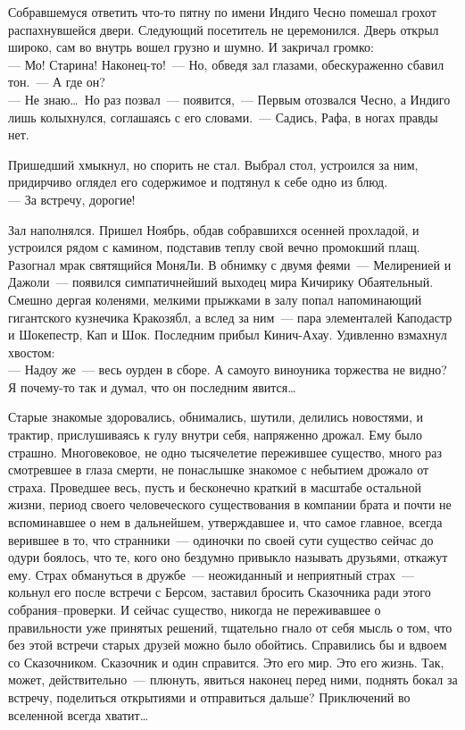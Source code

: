 Собравшемуся ответить что-то пятну по имени Индиго Чесно помешал грохот 
распахнувшейся двери. Следующий посетитель не церемонился. Дверь открыл широко, 
сам во внутрь вошел грузно и шумно. И закричал громко:\\
--- Мо! Старина! Наконец-то!~--- Но, обведя зал глазами, обескураженно сбавил 
тон.~--- А где он?\\
--- Не знаю\ldots\ Но раз позвал~--- появится,~--- Первым отозвался Чесно, а 
Индиго лишь колыхнулся, соглашаясь с его словами.~--- Садись, Рафа, в ногах правды нет.

Пришедший хмыкнул, но спорить не стал. Выбрал стол, устроился за ним, 
придирчиво оглядел его содержимое и подтянул к себе одно из блюд.\\
--- За встречу, дорогие!


Зал наполнялся. Пришел Ноябрь, обдав собравшихся осенней прохладой, и устроился 
рядом с камином, подставив теплу свой вечно промокший плащ. Разогнал мрак 
святящийся МоняЛи. В обнимку с двумя феями~--- Мелиренией и Дажоли~--- появился 
симпатичнейший выходец мира Кичирику Обаятельный. Смешно дергая коленями, 
мелкими прыжками в залу попал напоминающий гигантского кузнечика Кракозябл, а 
вслед за ним~--- пара элементалей Каподастр и Шокепестр, Кап и Шок. Последним 
прибыл Кинич-Ахау. Удивленно взмахнул хвостом:\\
--- Надоу же~--- весь оурден в сборе. А самоуго виноуника торжества не видно? Я 
почему-то так и думал, что он последним явится\ldots


Старые знакомые здоровались, обнимались, шутили, делились новостями, и трактир, 
прислушиваясь к гулу внутри себя, напряженно дрожал. Ему было страшно. 
Многовековое, не одно тысячелетие пережившее существо, много раз смотревшее в 
глаза смерти, не понаслышке знакомое с небытием дрожало от страха. Проведшее 
весь, пусть и бесконечно краткий в масштабе остальной жизни, период своего 
человеческого существования в компании брата и почти не вспоминавшее о нем в 
дальнейшем, утверждавшее и, что самое главное, всегда верившее в то, что 
странники~--- одиночки по своей сути существо сейчас до одури боялось, что те, 
кого оно бездумно привыкло называть друзьями, откажут ему. Страх обмануться в 
дружбе~--- неожиданный и неприятный страх~--- кольнул его после встречи с 
Берсом, заставил бросить Сказочника ради этого собрания--проверки. И сейчас существо, 
никогда не переживавшее о правильности уже принятых решений, тщательно гнало от 
себя мысль о том, что без этой встречи старых друзей можно было обойтись. 
Справились бы и вдвоем со Сказочником. Сказочник и один справится. Это его мир. 
Это его жизнь. Так, может, действительно~--- плюнуть, явиться наконец перед 
ними, поднять бокал за встречу, поделиться открытиями и отправиться дальше? 
Приключений во вселенной всегда хватит\ldots

